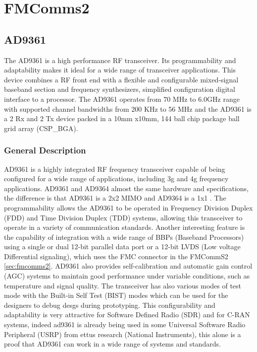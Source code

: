 \section{FMComms2}
\subsection{AD9361}
\label{sec:ad9361}

The AD9361 is a high performance RF transceiver. Its programmability and adaptability makes it ideal for a wide range of transceiver applications. This device combines a RF front end with a flexible and configurable mixed-signal baseband section and frequency synthesizers, simplified configuration digital interface to a processor.
The AD9361 operates from 70 MHz to 6.0GHz range with supported channel bandwidths from 200 KHz to 56 MHz and the AD9361 is a 2 Rx and 2 Tx device packed in a 10mm x10mm, 144 ball chip package ball grid array (CSP\_BGA).

\subsubsection{General Description}

AD9361 is a highly integrated RF frequency transceiver capable of being configured for a wide range of applications, including 3g and 4g frequency applications. AD9361 and AD9364 almost the same hardware and specifications, the difference is that AD9361 is a 2x2 MIMO and AD9364 is a 1x1 \cite{ad9361_wiki}.
The programmability allows the AD9361 to be operated in Frequency Division Duplex (FDD) and Time Division Duplex (TDD) systems, allowing this transceiver to operate in a variety of communication standards. Another interesting feature is the capability of integration with a wide range of BBPs (Baseband Processors) using a single or dual 12-bit parallel data port or a 12-bit LVDS (Low voltage Differential signaling), which uses the FMC connector in the FMCommS2 \ref{sec:fmcomms2}.
AD9361 also provides self-calibration and automatic gain control (AGC) systems to maintain good performance under variable conditions, such as temperature and signal quality. The transceiver has also various modes of test mode with the Built-in Self Test (BIST) modes which can be used for the designers to debug desgs during prototyping.
This configurability and adaptability is very attractive for Software Defined Radio (SDR) and for C-RAN systems, indeed ad9361 is already being used in some Universal Software Radio Peripheral (USRP) from ettus research (National Instruments), this alone is a proof that AD9361 can work in a wide range of systems and standards.

